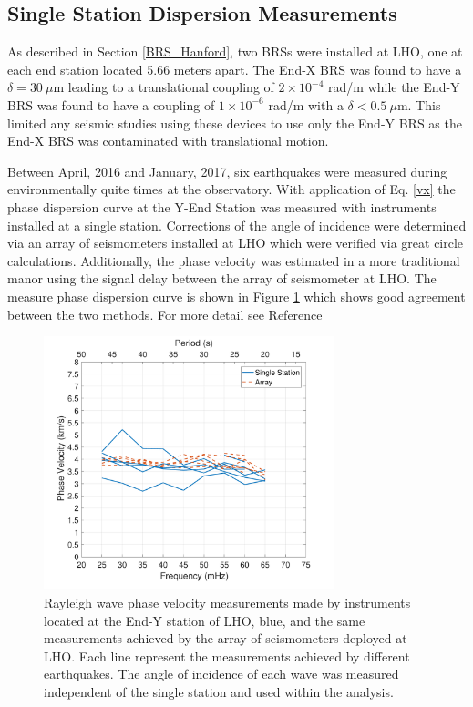 \documentclass [12pt, proquest]{uwthesis}[2019]
\begin{document}
\subsection{Single Station Dispersion Measurements}
As described in Section \ref{BRS_Hanford}, two BRSs were installed at LHO, one at each end station located 5.66 meters apart. The End-X BRS was found to have a $\delta=30\ \mu \text{m}$ leading to a translational coupling of $2 \times 10^{-4}$ rad/m while the End-Y BRS was found to have a coupling of $1 \times 10^{-6}$ rad/m with a $\delta<0.5\ \mu \text{m}$. This limited any seismic studies using these devices to use only the End-Y BRS as the End-X BRS was contaminated with translational motion. 

Between April, 2016 and January, 2017, six earthquakes were measured during environmentally quite times at the observatory. \cite{tiltSeismology} With application of Eq. \ref{vx} the phase dispersion curve at the Y-End Station was measured with instruments installed at a single station. Corrections of the angle of incidence were determined via an array of seismometers installed at LHO which were verified via great circle calculations. Additionally, the phase velocity was estimated in a more traditional manor using the signal delay between the array of seismometer at LHO. The measure phase dispersion curve is shown in Figure \ref{Phase_Hanford} which shows good agreement between the two methods. For more detail see Reference \cite{TiltSeimology}
 
\begin{figure}%
\begin{center}
\includegraphics[width=0.75\textwidth]{Vel.pdf}
\caption{Rayleigh wave phase velocity measurements made by instruments located at the End-Y station of LHO, blue, and the same measurements achieved by the array of seismometers deployed at LHO. Each line represent the measurements achieved by different earthquakes. The angle of incidence of each wave was measured independent of the single station and used within the analysis. \cite{tiltSeismology}}
\label{Phase_Hanford}
\end{center}
\end{figure}
\end{document}
